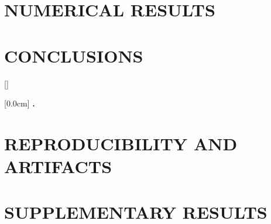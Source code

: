 \documentclass[a4paper,13pt,3p,twoside]{report}
\theoremstyle{definition}
\begin{document}
\newpage
\chapter{NUMERICAL RESULTS}\label{ch:results}


\newpage
\chapter{CONCLUSIONS}\label{ch:concl}


\newpage
\renewcommand\bibname{REFERENCE}
\printbibliography
{}

\appendixpage
\appendix
\addappheadtotoc

[]
\titlespacing*{\chapter}{0pt}{-20pt}{20pt}

    [0.0cm]             %
    {\bfseries\vspace{0.3cm}}                  %
    {{\bfseries{\scshape} \thecontentslabel.\ }} %
    {}         %
    {\contentspage} 
    
\chapter{REPRODUCIBILITY AND ARTIFACTS}


\newpage
\chapter{SUPPLEMENTARY RESULTS}

\end{document}
